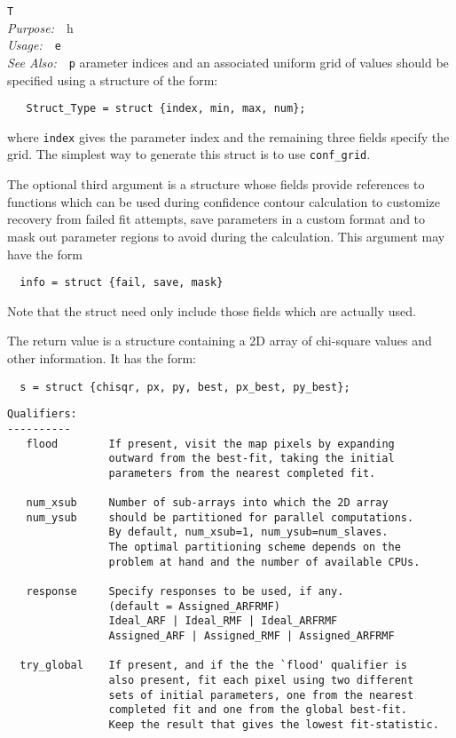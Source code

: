 \documentclass{book}
\makeatletter
\newif\ifpdf
\newenvironment{isisfunction}[4]%
{\index{{#1}@{\tt #1}}%
  \ifpdf
  \else
     \addcontentsline{toc}{subsection}{{#1} -- {#2}}
  \fi
  \vbox{
          \vspace*{\baselineskip}
          {\LARGE\tt #1}\vspace*{\baselineskip}\\
          {{\it Purpose:}~~{#2}}\\
          {{\it Usage:}~~{\tt #3}}\\
          {{\it See Also:}~~{\tt #4}}
       }
}%
{ }
\makeatother
\begin{document}
{\begin{isisfunction}
The parameter indices and an associated uniform grid of values
should be specified using a structure of the form:
\begin{verbatim}
   Struct_Type = struct {index, min, max, num};
\end{verbatim}
where \verb|index| gives the parameter index and the remaining
three fields specify the grid.  The simplest way to generate
this struct is to use \verb|conf_grid|.

The optional third argument is a structure whose fields provide
references to functions which can be used during confidence
contour calculation to customize recovery from failed fit
attempts, save parameters in a custom format and to mask out
parameter regions to avoid during the calculation.
This argument may have the form
\begin{verbatim}
  info = struct {fail, save, mask}
\end{verbatim}
Note that the struct need only include those fields
which are actually used.

The return value is a structure containing a 2D array of
chi-square values and other information.  It has the form:
\begin{verbatim}
  s = struct {chisqr, px, py, best, px_best, py_best};
\end{verbatim}

\begin{verbatim}
Qualifiers:
----------
   flood        If present, visit the map pixels by expanding
                outward from the best-fit, taking the initial
                parameters from the nearest completed fit.

   num_xsub     Number of sub-arrays into which the 2D array
   num_ysub     should be partitioned for parallel computations.
                By default, num_xsub=1, num_ysub=num_slaves.
                The optimal partitioning scheme depends on the
                problem at hand and the number of available CPUs.

   response     Specify responses to be used, if any.
                (default = Assigned_ARFRMF)
                Ideal_ARF | Ideal_RMF | Ideal_ARFRMF
                Assigned_ARF | Assigned_RMF | Assigned_ARFRMF

  try_global    If present, and if the the `flood' qualifier is
                also present, fit each pixel using two different
                sets of initial parameters, one from the nearest
                completed fit and one from the global best-fit.
                Keep the result that gives the lowest fit-statistic.
\end{verbatim}


\end{isisfunction}}
\end{document}
